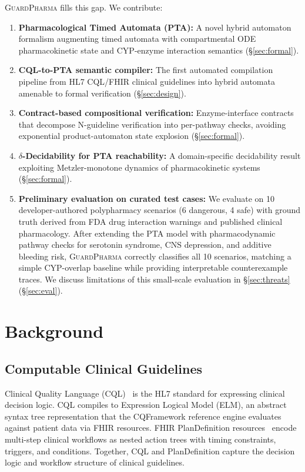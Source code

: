 \documentclass{article}
\theoremstyle{definition}
\begin{document}
\textsc{GuardPharma} fills this gap. We contribute:

\begin{enumerate}[leftmargin=*]
\item \textbf{Pharmacological Timed Automata (PTA):} A novel hybrid automaton formalism augmenting timed automata with compartmental ODE pharmacokinetic state and CYP-enzyme interaction semantics (\S\ref{sec:formal}).
\item \textbf{CQL-to-PTA semantic compiler:} The first automated compilation pipeline from HL7 CQL/FHIR clinical guidelines into hybrid automata amenable to formal verification (\S\ref{sec:design}).
\item \textbf{Contract-based compositional verification:} Enzyme-interface contracts that decompose N-guideline verification into per-pathway checks, avoiding exponential product-automaton state explosion (\S\ref{sec:formal}).
\item \textbf{$\delta$-Decidability for PTA reachability:} A domain-specific decidability result exploiting Metzler-monotone dynamics of pharmacokinetic systems (\S\ref{sec:formal}).
\item \textbf{Preliminary evaluation on curated test cases:} We evaluate on 10 developer-authored polypharmacy scenarios (6 dangerous, 4 safe) with ground truth derived from FDA drug interaction warnings and published clinical pharmacology. After extending the PTA model with pharmacodynamic pathway checks for serotonin syndrome, CNS depression, and additive bleeding risk, \textsc{GuardPharma} correctly classifies all 10 scenarios, matching a simple CYP-overlap baseline while providing interpretable counterexample traces. We discuss limitations of this small-scale evaluation in \S\ref{sec:threats} (\S\ref{sec:eval}).
\end{enumerate}

\section{Background}
\label{sec:background}

\subsection{Computable Clinical Guidelines}

Clinical Quality Language (CQL)~\cite{cql_spec} is the HL7 standard for expressing clinical decision logic. CQL compiles to Expression Logical Model (ELM), an abstract syntax tree representation that the CQFramework reference engine evaluates against patient data via FHIR resources. FHIR PlanDefinition resources~\cite{fhir_plandefinition} encode multi-step clinical workflows as nested action trees with timing constraints, triggers, and conditions. Together, CQL and PlanDefinition capture the decision logic and workflow structure of clinical guidelines.
\end{document}
